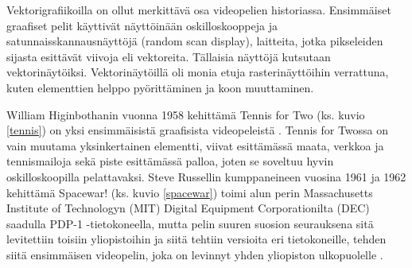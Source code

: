 \documentclass[utf8,bachelor]{gradu3}
\begin{document}
Vektorigrafiikoilla on ollut merkittävä osa videopelien historiassa. Ensimmäiset graafiset pelit käyttivät näyttöinään oskilloskooppeja ja satunnaisskannausnäyttöjä (random scan display), laitteita, jotka pikseleiden sijasta esittävät viivoja eli vektoreita. Tällaisia näyttöjä kutsutaan vektorinäytöiksi. Vektorinäytöillä oli monia etuja rasterinäyttöihin verrattuna, kuten elementtien helppo pyörittäminen ja koon muuttaminen. \parencite{RefWorks:doc:5be179afe4b05afcfde72671}

William Higinbothanin vuonna 1958 kehittämä Tennis for Two (ks. kuvio \ref{tennis}) on yksi ensimmäisistä graafisista videopeleistä \parencite{RefWorks:doc:5be15b13e4b05b9281959f24}. Tennis for Twossa on vain muutama yksinkertainen elementti, viivat esittämässä maata, verkkoa ja tennismailoja sekä piste esittämässä palloa, joten se soveltuu hyvin oskilloskoopilla pelattavaksi. Steve Russellin kumppaneineen vuosina 1961 ja 1962 kehittämä Spacewar! (ks. kuvio \ref{spacewar}) toimi alun perin Massachusetts Institute of Technologyn (MIT) Digital Equipment Corporationilta (DEC) saadulla PDP-1 -tietokoneella, mutta pelin suuren suosion seurauksena sitä levitettiin toisiin yliopistoihin ja siitä tehtiin versioita eri tietokoneille, tehden siitä ensimmäisen videopelin, joka on levinnyt yhden yliopiston ulkopuolelle \parencites{RefWorks:doc:5be15b13e4b05b9281959f24}{RefWorks:doc:5be9d948e4b0304fd3d1692a}. %
\end{document}
